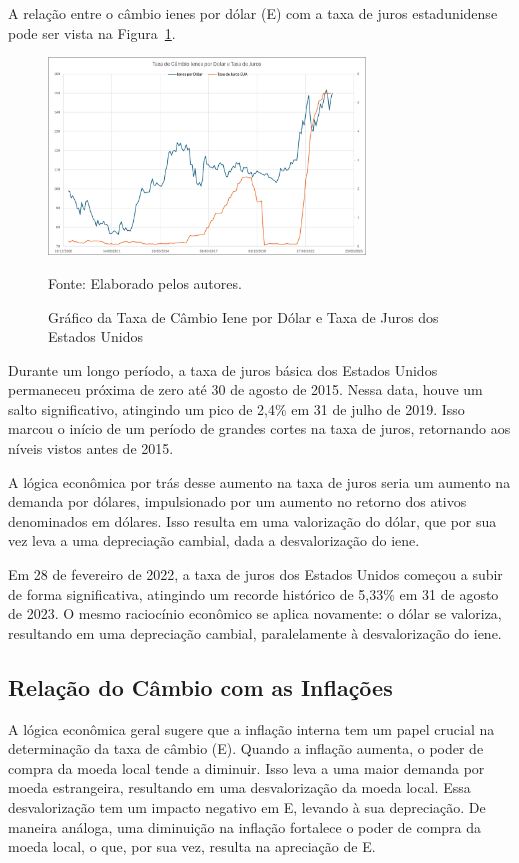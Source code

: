 \documentclass[a4paper,12pt]{article}[abntex2]
\begin{document}
A relação entre o câmbio ienes por dólar (E) com a taxa de juros estadunidense pode ser vista na  Figura~\ref{fig:cambioJurosEUA}.
 \begin{figure}[H]
    \centering
    \caption{Gráfico da Taxa de Câmbio Iene por Dólar e Taxa de Juros dos Estados Unidos} 
    \includegraphics[width=0.75\textwidth]{Câmbio e Juros estadunidense.png}
    \label{fig:cambioJurosEUA}
    
    \footnotesize{Fonte: Elaborado pelos autores.}
    \end{figure}

Durante um longo período, a taxa de juros básica dos Estados Unidos permaneceu próxima de zero até 30 de agosto de 2015. Nessa data, houve um salto significativo, atingindo um pico de 2,4\% em 31 de julho de 2019. Isso marcou o início de um período de grandes cortes na taxa de juros, retornando aos níveis vistos antes de 2015.

A lógica econômica por trás desse aumento na taxa de juros seria um aumento na demanda por dólares, impulsionado por um aumento no retorno dos ativos denominados em dólares. Isso resulta em uma valorização do dólar, que por sua vez leva a uma depreciação cambial, dada a desvalorização do iene.

Em 28 de fevereiro de 2022, a taxa de juros dos Estados Unidos começou a subir de forma significativa, atingindo um recorde histórico de 5,33\% em 31 de agosto de 2023. O mesmo raciocínio econômico se aplica novamente: o dólar se valoriza, resultando em uma depreciação cambial, paralelamente à desvalorização do iene.

\subsection{\textbf{Relação do Câmbio com as Inflações}}

A lógica econômica geral sugere que a inflação interna tem um papel crucial na determinação da taxa de câmbio (E). Quando a inflação aumenta, o poder de compra da moeda local tende a diminuir. Isso leva a uma maior demanda por moeda estrangeira, resultando em uma desvalorização da moeda local. Essa desvalorização tem um impacto negativo em E, levando à sua depreciação. De maneira análoga, uma diminuição na inflação fortalece o poder de compra da moeda local, o que, por sua vez, resulta na apreciação de E.
\end{document}
